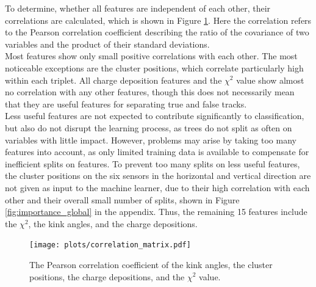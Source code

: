 To determine, whether all features are independent of each other, their correlations are calculated, which is shown in Figure \ref{fig:corr}. Here the correlation
refers to the Pearson correlation coefficient \cite{pearson} describing the ratio of the covariance of two variables and the product of their standard deviations. \\
Most features show only small positive correlations with each other. The most noticeable exceptions are the cluster positions, which correlate particularly high within each
triplet. All charge deposition features and the $\chi^2$ value show almost no correlation with any other features, though this does not necessarily mean that they are
useful features for separating true and false tracks. \\
Less useful features
are not expected to contribute significantly to classification, but also do not disrupt the learning process, as trees do not split as often on variables with little impact.
However, problems may arise by taking too many features into account, as only limited training data is available to compensate for inefficient splits on features.
To prevent too many splits on less useful features,
the cluster positions on the six sensors in the horizontal and vertical direction are not given as input to the machine learner,
due to their high correlation with each other and their overall small number of splits, shown in Figure \ref{fig:importance_global} in the appendix.
Thus, the remaining 15 features include the $\chi^2$, the kink angles, and the charge depositions.
\begin{figure}
  \hspace{-2.5cm}
  \texttt{[image: plots/correlation\_matrix.pdf]}
  \vspace{-1.8cm}
  \caption{The Pearson correlation coefficient of the kink angles, the cluster positions, the charge depositions, and the $\chi^2$ value.}
  \label{fig:corr}
\end{figure}


